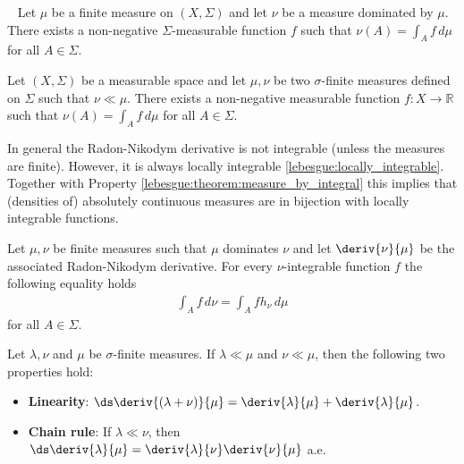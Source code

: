     \begin{theorem}~\newline
        Let $\mu$ be a finite measure on $(X, \Sigma)$ and let $\nu$ be a measure dominated by $\mu$. There exists a non-negative $\Sigma$-measurable function $f$ such that $\nu(A) = \int_Af\,d\mu$ for all $A\in\Sigma$.
    \end{theorem}


    \begin{theorem}
        Let $(X,\Sigma)$ be a measurable space and let $\mu,\nu$ be two $\sigma$-finite measures defined on $\Sigma$ such that $\nu\ll\mu$. There exists a non-negative measurable function $f:X\rightarrow\mathbb{R}$ such that $\nu(A) = \int_Af\,d\mu$ for all $A\in\Sigma$.
    \end{theorem}
    \begin{property}
        In general the Radon-Nikodym derivative is not integrable (unless the measures are finite). However, it is always locally integrable \ref{lebesgue:locally_integrable}. Together with Property \ref{lebesgue:theorem:measure_by_integral} this implies that (densities of) absolutely continuous measures are in bijection with locally integrable functions.
    \end{property}

    \begin{property}
        Let $\mu, \nu$ be finite measures such that $\mu$ dominates $\nu$ and let $\deriv{\nu}{\mu}$ be the associated Radon-Nikodym derivative. For every $\nu$-integrable function $f$ the following equality holds
        \begin{gather}
            \int_A f\,d\nu = \int_A fh_\nu\,d\mu
        \end{gather}
        for all $A\in\Sigma$.
    \end{property}

    \begin{property}
        Let $\lambda,\nu$ and $\mu$ be $\sigma$-finite measures. If $\lambda\ll\mu$ and $\nu\ll\mu$, then the following two properties hold:
        \begin{itemize}
            \item \textbf{Linearity}: $\ds\deriv{(\lambda+\nu)}{\mu} = \deriv{\lambda}{\mu} + \deriv{\lambda}{\mu}$.
            \item \textbf{Chain rule}: If $\lambda\ll\nu$, then $\ds\deriv{\lambda}{\mu} = \deriv{\lambda}{\nu}\deriv{\nu}{\mu}$ a.e.
        \end{itemize}
    \end{property}